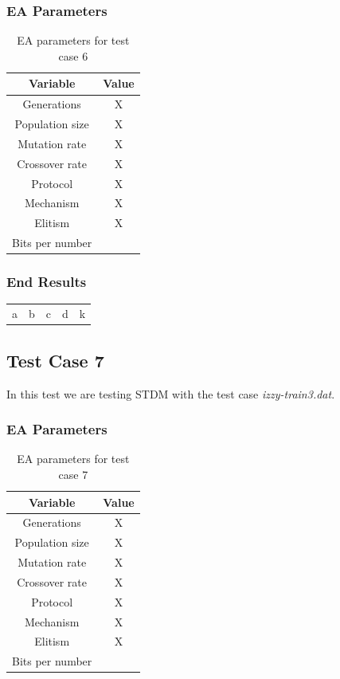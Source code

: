 \subsubsection{EA Parameters}\label{sec:test-case-6-parameters}
\begin{table}
	\begin{tabular}{c c}
		Variable & Value \\
		\hline
		Generations & X \\
		\hline
		Population size & X \\
		\hline
		Mutation rate & X \\
		\hline
		Crossover rate & X \\
		\hline
		Protocol & X \\
		\hline
		Mechanism & X \\
		\hline
		Elitism & X \\
		\hline
		Bits per number & \\
	\end{tabular}
	\caption{EA parameters for test case 6}
\end{table}
\subsubsection{End Results}\label{sec:test-case-6-results}
\begin{table}
	\begin{tabular}{c c c c c}
		a & b & c & d & k \\
	\end{tabular}
\end{table}

\subsection{Test Case 7}\label{sec:test-case-7}
In this test we are testing STDM with the test case
\textit{izzy-train3.dat}.
\subsubsection{EA Parameters}\label{sec:test-case-7-parameters}
\begin{table}
	\begin{tabular}{c c}
		Variable & Value \\
		\hline
		Generations & X \\
		\hline
		Population size & X \\
		\hline
		Mutation rate & X \\
		\hline
		Crossover rate & X \\
		\hline
		Protocol & X \\
		\hline
		Mechanism & X \\
		\hline
		Elitism & X \\
		\hline
		Bits per number & \\
	\end{tabular}
	\caption{EA parameters for test case 7}
\end{table}

